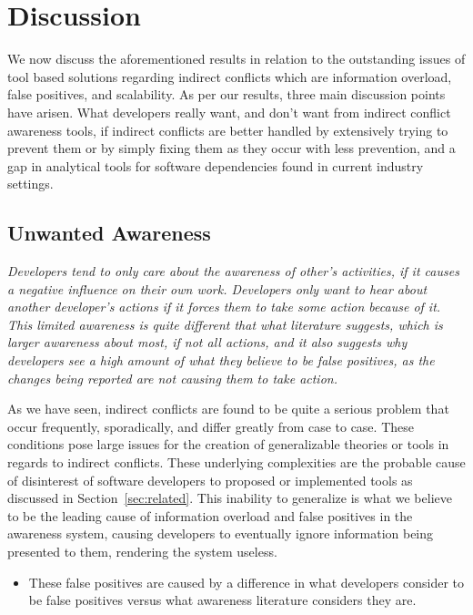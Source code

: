 \documentclass[conference]{IEEEtran}
\begin{document}
\section{Discussion}
\label{sec:disc}

We now discuss the aforementioned
results in relation to the outstanding issues of tool based solutions regarding indirect conflicts which are information overload,
false positives, and scalability.
As per our results, three main discussion points have arisen. What developers really want, and don't want from indirect
conflict awareness tools, if indirect conflicts are better handled by extensively trying to prevent them or by simply
fixing them as they occur with less prevention, and a gap in analytical tools for software dependencies found in current
industry settings.

\subsection{Unwanted Awareness}

\textit{Developers tend to only care about the awareness of other's activities, if it causes
a negative influence on their own work. Developers only want to hear about another developer's actions if it forces them
to take some action because of it. This limited awareness is quite different that what literature suggests, which is larger
awareness about most, if not all actions, and it also suggests why developers see a high amount of what they believe to be
false positives, as the changes being reported are not causing them to take action.}

As we have seen, indirect conflicts are found to be quite a serious problem that occur frequently,
sporadically, and differ greatly from case to case. These conditions pose large issues for the creation of generalizable theories
or tools in regards to indirect conflicts. These underlying complexities are the probable cause of disinterest of software developers
to proposed or implemented tools as discussed in Section~\ref{sec:related}. This inability to generalize is what we believe to be the
leading cause of information overload and false positives in the awareness system, causing developers to eventually ignore
information being presented to them, rendering the system useless.

\begin{itemize}
	\item These false positives are caused by a difference in what
				developers consider to be false positives versus what awareness literature considers they are.
\end{itemize}
\end{document}
